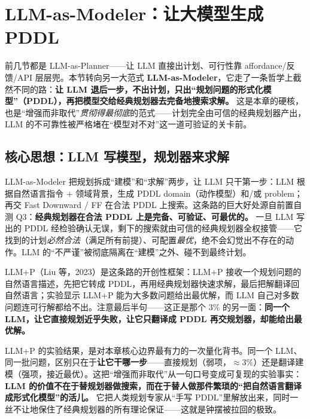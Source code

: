 \section{LLM-as-Modeler：让大模型生成 PDDL}
\label{sec:llm-modeler}

前几节都是 LLM-as-Planner——让 LLM 直接出计划、可行性靠 affordance/反馈/API 层层兜。本节转向另一大范式 \textbf{LLM-as-Modeler}，它走了一条哲学上截然不同的路：\textbf{让 LLM 退后一步，不出计划，只出“规划问题的形式化模型”（PDDL），再把模型交给经典规划器去完备地搜索求解。} 这是本章的硬核，也是“增强而非取代”\emph{贯彻得最彻底}的范式——计划完全由可信的经典规划器产出，LLM 的不可靠性被严格堵在“模型对不对”这一道可验证的关卡前。

\subsection{核心思想：LLM 写模型，规划器来求解}
\label{sec:modeler-core}

LLM-as-Modeler 把规划拆成“建模”和“求解”两步，让 LLM 只干第一步：LLM 根据自然语言指令 $+$ 领域背景，生成 PDDL domain（动作模型）和/或 problem；再交 Fast Downward / FF 在合法 PDDL 上搜索。这条路的巨大好处源自前置自测 Q3：\textbf{经典规划器在合法 PDDL 上是完备、可验证、可最优的。} 一旦 LLM 写出的 PDDL 经检验确认无误，剩下的搜索就由可信的经典规划器全权接管——它找到的计划\emph{必然合法}（满足所有前提）、可配置\emph{最优}，绝不会幻觉出不存在的动作。LLM 的“不严谨”被彻底隔离在“建模”之外、碰不到最终计划。

LLM+P（Liu 等，2023）是这条路的开创性框架：LLM+P 接收一个规划问题的自然语言描述，先把它转成 PDDL，再用经典规划器快速求解，最后把解翻译回自然语言；实验显示 LLM+P 能为大多数问题给出最优解，而 LLM 自己对多数问题连可行解都给不出\cite{liu2023llmp}。注意最后半句——这正是那个 $3\%$ 的另一面：\textbf{同一个 LLM，让它直接规划近乎失败，让它只翻译成 PDDL 再交规划器，却能给出最优解。}

\begin{insight}
LLM+P 的实验结果，是对本章核心边界最有力的一次量化背书。同一个 LLM、同一批问题，区别只在于\textbf{让它干哪一步}——直接规划（弱项，$\approx 3\%$）还是翻译建模（强项，接近最优）。这把“增强而非取代”从一句口号变成可复现的实验事实：\textbf{LLM 的价值不在于替规划器做搜索，而在于替人做那件繁琐的“把自然语言翻译成形式化模型”的活儿。} 它把人类规划专家从“手写 PDDL”里解放出来，同时一丝不让地保住了经典规划器的所有理论保证——这就是钟摆被拉回的极致。
\end{insight}


